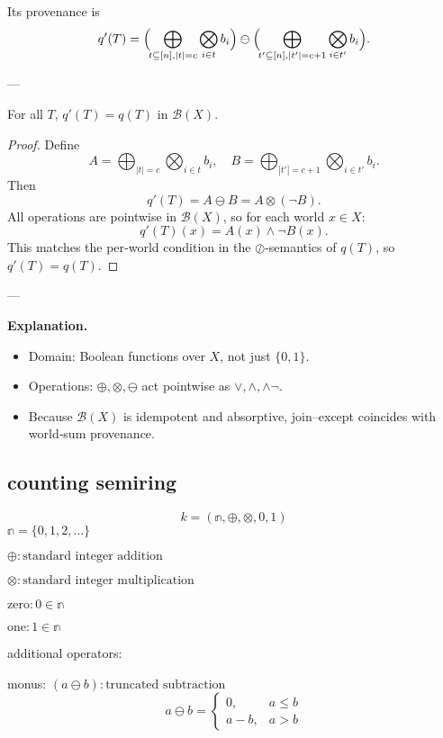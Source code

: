 Its provenance is
\[
q'(T)=\Bigl(\!\bigoplus_{t\subseteq[n],|t|=c}\bigotimes_{i\in t}b_i\Bigr)
\ominus
\Bigl(\!\bigoplus_{t'\subseteq[n],|t'|=c+1}\bigotimes_{i\in t'}b_i\Bigr).
\]

---

\begin{proposition}
For all \(T\), \(q'(T)=q(T)\) in \(\mathcal{B}(X)\).
\end{proposition}

\begin{proof}
Define
\[
A=\bigoplus_{|t|=c}\bigotimes_{i\in t}b_i, \quad
B=\bigoplus_{|t'|=c+1}\bigotimes_{i\in t'}b_i.
\]
Then
\[
q'(T)=A\ominus B=A\otimes(\neg B).
\]
All operations are pointwise in \(\mathcal{B}(X)\), so for each world \(x\in X\):
\[
q'(T)(x)=A(x)\wedge\neg B(x).
\]
This matches the per‐world condition in the $\oslash$‐semantics of $q(T)$, so $q'(T)=q(T)$.
\end{proof}

---

\noindent\textbf{Explanation.}
\begin{itemize}
  \item Domain: Boolean functions over $X$, not just $\{0,1\}$.  
  \item Operations: $\oplus,\otimes,\ominus$ act pointwise as $\vee,\wedge,\wedge\neg$.  
  \item Because $\mathcal{B}(X)$ is idempotent and absorptive, join–except coincides with world‐sum provenance.
\end{itemize}              


\subsection{counting semiring}
$$k = (\mathbb{n}, \oplus, \otimes, 0, 1)$$
$\mathbb{n} = \{0,1,2,\dots\}$

$\oplus : \text{standard integer addition}$

$\otimes : \text{standard integer multiplication}$

$\text{zero} : 0 \in \mathbb{n}$

$\text{one} : 1 \in \mathbb{n}$

additional operators:

monus: $(a \ominus b): \text{truncated subtraction}$
$$ a \ominus b = \begin{cases} 0, &  a\leq b\\ a-b,& a>b \end{cases}$$

